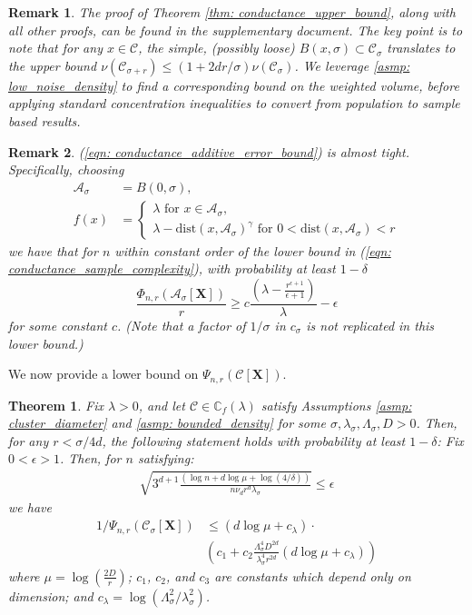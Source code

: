 \documentclass{article}
\newcommand{\1}{\mathbf{1}}
\newcommand{\dist}{\mathrm{dist}}
\newcommand{\Xbf}{\mathbf{X}}
\newcommand{\Cbb}{\mathbb{C}}
\newcommand{\Cset}{\mathcal{C}}
\newcommand{\Aset}{\mathcal{A}}
\newcommand{\Asig}{\Aset_{\sigma}}
\newcommand{\Csig}{\Cset_{\sigma}}
\theoremstyle{aldenthm}
\newtheorem{theorem}{Theorem}
\theoremstyle{aldenrmrk}
\newtheorem{remark}{Remark}
\begin{document}
\begin{remark}
	The proof of Theorem \ref{thm: conductance_upper_bound}, along with all other proofs, can be found in the supplementary document. The key point is to note that for any $x \in \Cset$, the simple, (possibly loose) $B(x,\sigma) \subset \Csig$ translates to the upper bound $\nu(\Cset_{\sigma + r}) \leq (1 + 2d r /\sigma)\nu(\Csig)$. We leverage \ref{asmp: low_noise_density} to find a corresponding bound on the weighted volume, before applying standard concentration inequalities to convert from population to sample based results.
\end{remark}
\begin{remark}
	(\ref{eqn: conductance_additive_error_bound}) is almost tight. Specifically, choosing
	\begin{align*}
	\Asig & = B(0,\sigma), \\
	 f(x) & = 
	 \begin{cases}
	 \lambda \text{ for $x \in \Asig$}, \\
	 \lambda - \dist(x,\Asig)^{\gamma} \text{ for $0 < \dist(x,\Asig) < r$}
	 \end{cases}
	\end{align*}
	we have that for $n$ within constant order of the lower bound in (\ref{eqn: conductance_sample_complexity}), with probability at least $1 - \delta$
	\begin{equation*}
	\frac{\Phi_{n,r}(\Asig[\mathbf{X}])}{r} \geq c \frac{(\lambda - \frac{r^{\epsilon+1}}{\epsilon+1})}{\lambda} - \epsilon
	\end{equation*}
	for some constant $c$. (Note that a factor of $1 / \sigma$ in $c_{\sigma}$ is not replicated in this lower bound.)
\end{remark}

We now provide a lower bound on $\Psi_{n,r}(\Cset[\Xbf])$.

\begin{theorem}
	\label{thm: inverse_mixing_time_lower_bound_nonconvex}
	Fix $\lambda > 0$, and let $\Cset \in \Cbb_f(\lambda)$ satisfy Assumptions \ref{asmp: cluster_diameter} and \ref{asmp: bounded_density} for some $\sigma, \lambda_{\sigma}, \Lambda_{\sigma}, D > 0$. Then, for any $r < \sigma/4d$, the following statement holds with probability at least $1 - \delta$: Fix $0 < \epsilon > 1$. Then, for $n$ satisfying:
	\begin{align*}
	\sqrt{3^{d+1}\frac{(\log n + d\log \mu + \log(4/\delta))}{n \nu_d r^d \lambda_{\sigma}}} \leq \epsilon
	\end{align*}
	we have
	\begin{align}
	\label{eqn: inverse_mixing_time_lower_bound_nonconvex}
	1 / \Psi_{n,r}(\Csig[\Xbf]) & \leq \left(d \log \mu + c_{\lambda} \right) \cdot \nonumber \\ 
	& \left(c_1 + c_2 \frac{\Lambda_{\sigma}^4D^{2d}}{\lambda_{\sigma}^4r^{2d}}\left(d \log \mu + c_{\lambda}\right)\right)
	\end{align}
	where $\mu = \log(\frac{2D}{r})$; $c_1$, $c_2$, and $c_3$ are constants which depend only on dimension; and $c_{\lambda} = \log(\Lambda_{\sigma}^2/ \lambda_{\sigma}^2)$. 
\end{theorem}
\end{document}
